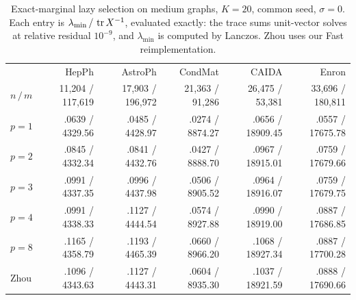 \begin{table}[t]
\centering\footnotesize
\caption{Exact-marginal lazy selection on medium graphs, $K=20$,
common seed, $\sigma=0$. Each entry is $\lambda_{\min}\,/\,\operatorname{tr} X^{-1}$,
evaluated exactly: the trace sums unit-vector solves at relative
residual $10^{-9}$, and $\lambda_{\min}$ is computed by Lanczos.
Zhou uses our Fast reimplementation.}
\label{tab:medium}
\setlength{\tabcolsep}{5pt}
\begin{tabular}{@{}lrrrrr@{}}\toprule
& HepPh & AstroPh & CondMat & CAIDA & Enron\\
$n\,/\,m$ & 11,204 / 117,619 & 17,903 / 196,972 & 21,363 / 91,286 & 26,475 / 53,381 & 33,696 / 180,811\\\midrule
$p=1$ & .0639 / 4329.56 & .0485 / 4428.97 & .0274 / 8874.27 & .0656 / 18909.45 & .0557 / 17675.78\\
$p=2$ & .0845 / 4332.34 & .0841 / 4432.76 & .0427 / 8888.70 & .0967 / 18915.01 & .0759 / 17679.66\\
$p=3$ & .0991 / 4337.35 & .0996 / 4437.98 & .0506 / 8905.52 & .0964 / 18916.07 & .0759 / 17679.75\\
$p=4$ & .0991 / 4338.33 & .1127 / 4444.54 & .0574 / 8927.88 & .0990 / 18919.00 & .0887 / 17686.85\\
$p=8$ & .1165 / 4358.79 & .1193 / 4465.39 & .0660 / 8966.20 & .1068 / 18927.34 & .0887 / 17700.28\\
Zhou & .1096 / 4343.63 & .1127 / 4443.31 & .0604 / 8935.30 & .1037 / 18921.59 & .0888 / 17690.66\\
\bottomrule\end{tabular}
\end{table}

